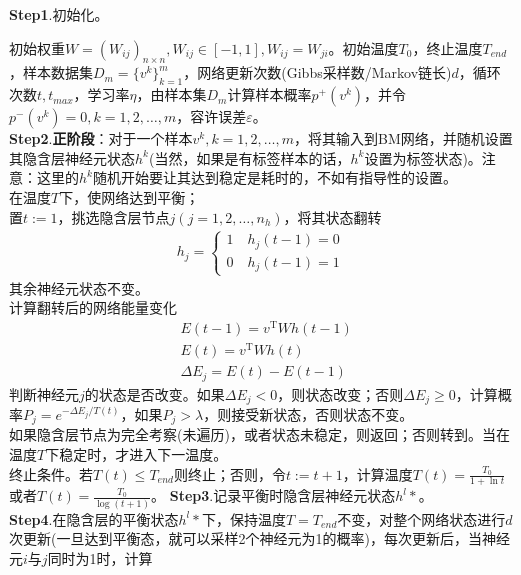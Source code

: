             \textbf{Step1}.初始化。
            \par
            初始权重$W=(W_{ij})_{n\times n},W_{ij}\in [-1,1],W_{ij} = W_{ji}$。初始温度$T_0$，终止温度$T_{end}$，样本数据集$D_m = \{v^k\}_{k=1}^m$，网络更新次数(Gibbs采样数/Markov链长)$d$，循环次数$t,t_{max}$，学习率$\eta$，由样本集$D_m$计算样本概率$p^+(v^k)$，并令$p^-(v^k) = 0,k=1,2,\dots,m$，容许误差$\varepsilon$。\\
            \textbf{Step2}.\textbf{正阶段}：对于一个样本$v^k,k=1,2,\dots,m$，将其输入到BM网络，并随机设置其隐含层神经元状态$h^k$(当然，如果是有标签样本的话，$h^k$设置为标签状态)。注意：这里的$h^k$随机开始要让其达到稳定是耗时的，不如有指导性的设置。\\
            在温度$T$下，使网络达到平衡；\\
            置$t:=1$，挑选隐含层节点$j(j=1,2,\dots,n_h)$，将其状态翻转
            \begin{align*}
            h_j=
            \left\{
            \begin{aligned}
            1\quad h_j(t-1) = 0\\
            0\quad h_j(t-1) = 1
            \end{aligned}
            \right.
            \end{align*}
            其余神经元状态不变。\\
            计算翻转后的网络能量变化
            \begin{align*}
            & E(t-1) = v^\mathrm{T}Wh(t-1)\\
            & E(t) = v^\mathrm{T}Wh(t)\\
            & \Delta E_j = E(t)-E(t-1)
            \end{align*}
            判断神经元$j$的状态是否改变。如果$\Delta E_j<0$，则状态改变；否则$\Delta E_j \geqslant 0$，计算概率$P_j = e^{-\Delta E_j/T(t)}$，如果$P_j >\lambda$，则接受新状态，否则状态不变。\\
            如果隐含层节点为完全考察(未遍历)，或者状态未稳定，则返回；否则转到。当在温度$T$下稳定时，才进入下一温度。\\
            终止条件。若$T(t) \leqslant T_{end}$则终止；否则，令$t:=t+1$，计算温度$T(t) = \frac{T_0}{1+\ln t}$或者$T(t) = \frac{T_0}{\log (t+1)}$。
            \textbf{Step3}.记录平衡时隐含层神经元状态$h^l*$。\\
            \textbf{Step4}.在隐含层的平衡状态$h^l*$下，保持温度$T= T_{end}$不变，对整个网络状态进行$d$次更新(一旦达到平衡态，就可以采样2个神经元为1的概率)，每次更新后，当神经元$i$与$j$同时为1时，计算
